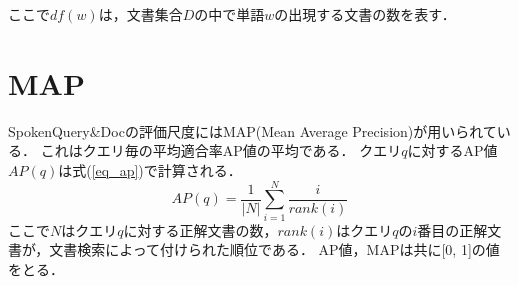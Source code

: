 ここで$df(w)$は，文書集合$D$の中で単語$w$の出現する文書の数を表す．\\

\section{MAP}
SpokenQuery\&Docの評価尺度にはMAP(Mean Average Precision)が用いられている．
これはクエリ毎の平均適合率AP値の平均である．
クエリ$q$に対するAP値$AP(q)$は式(\ref{eq_ap})で計算される．
\begin{equation}
    AP(q) = \frac{1}{|N|} \sum^N_{i=1} \frac{i}{rank(i)}    \label{eq_ap}
\end{equation}
ここで$N$はクエリ$q$に対する正解文書の数，$rank(i)$はクエリ$q$の$i$番目の正解文書が，文書検索によって付けられた順位である．
AP値，MAPは共に[0, 1]の値をとる．
